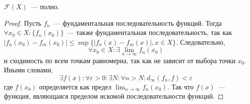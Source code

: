\documentclass[11pt]{report}
\begin{document}
    \begin{lemma}
    $\mathcal{F}(X)$~--- полно.
    \begin{proof}
    Пусть $f_{n}$~--- фундаментальная последовательность функций. Тогда $\forall x_0 \in X: \{f_{n}(x_0)\}$~--- также фундаментальная последовательность, так как $|f_{n}(x_0) - f_{m}(x_0)| \leq \sup\{|f_{n}(x) - f_{m}(x)|, x \in X\}$. Следовательно,
    \begin{equation*}
        \forall x_0 \in X: \exists \lim_{n \to \infty} f_{n}(x_0)
    \end{equation*}
    и сходимость по всем точкам равномерна, так как не зависит от выбора точки $x_0$. Иными словами,
    \begin{equation*}
        \exists f(x): \forall \varepsilon > 0: \exists N: \forall n > N: d_{\infty}(f_n, f) < \varepsilon
    \end{equation*}
    где $f(x_0)$ определяется как предел $ \lim_{n \to \infty} f_{n}(x_0)$. Так что $f(x)$~--- функция, являющаяся пределом искомой последовательности функций.
    \end{proof}
    \end{lemma}
\end{document}
